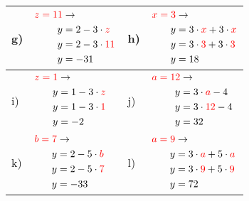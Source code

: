 \documentclass[12pt]{article}
\begin{document}
\begin{xltabular}{\textwidth}{|C{0.75cm}|X|C{0.75cm}|X|}
\\\hline
g)&$\begin{aligned}
\textcolor{red}{z=11} & \rightarrow\\
y&=2 - 3 \cdot \textcolor{red}{z}\\
y&=2 - 3 \cdot \textcolor{red}{11}\\
y&=-31\\
\end{aligned}$
&
h)&$\begin{aligned}
\textcolor{red}{x=3} & \rightarrow\\
y&=3 \cdot \textcolor{red}{x} + 3 \cdot \textcolor{red}{x}\\
y&=3 \cdot \textcolor{red}{3} + 3 \cdot \textcolor{red}{3}\\
y&=18\\
\end{aligned}$
\\\hline
i)&$\begin{aligned}
\textcolor{red}{z=1} & \rightarrow\\
y&=1 - 3 \cdot \textcolor{red}{z}\\
y&=1 - 3 \cdot \textcolor{red}{1}\\
y&=-2\\
\end{aligned}$
&
j)&$\begin{aligned}
\textcolor{red}{a=12} & \rightarrow\\
y&=3 \cdot \textcolor{red}{a} - 4\\
y&=3 \cdot \textcolor{red}{12} - 4\\
y&=32\\
\end{aligned}$
\\\hline
k)&$\begin{aligned}
\textcolor{red}{b=7} & \rightarrow\\
y&=2 - 5 \cdot \textcolor{red}{b}\\
y&=2 - 5 \cdot \textcolor{red}{7}\\
y&=-33\\
\end{aligned}$
&
l)&$\begin{aligned}
\textcolor{red}{a=9} & \rightarrow\\
y&=3 \cdot \textcolor{red}{a} + 5 \cdot \textcolor{red}{a}\\
y&=3 \cdot \textcolor{red}{9} + 5 \cdot \textcolor{red}{9}\\
y&=72\\
\end{aligned}$

\end{xltabular}
\end{document}
